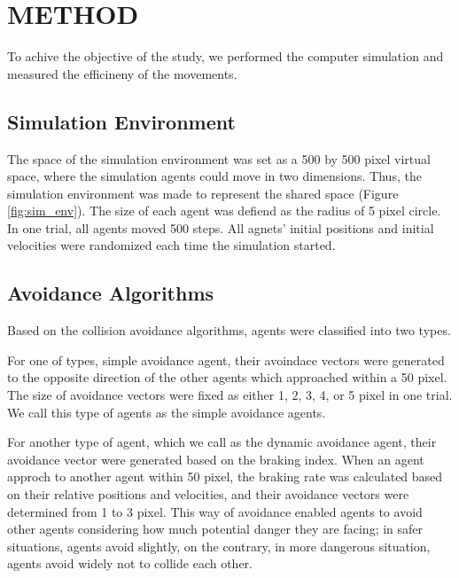 \documentclass[letterpaper, 10 pt, conference]{ieeeconf}  %
\begin{document}
\section{METHOD}
To achive the objective of the study, we performed the computer simulation and measured the efficineny of the movements.  

\subsection{Simulation Environment}
The space of the simulation environment was set as a 500 by 500 pixel virtual space, where the simulation agents could move in two dimensions. Thus, the simulation environment was made to represent the shared space (Figure \ref{fig:sim_env}). The size of each agent was defiend as the radius of 5 pixel circle. In one trial, all agents moved 500 steps. All agnets' initial positions and initial velocities were randomized each time the simulation started.

\subsection{Avoidance Algorithms}
Based on the collision avoidance algorithms, agents were classified into two types.

For one of types, simple avoidance agent, their avoindace vectors were generated to the opposite direction of the other agents which approached within a 50 pixel. The size of avoidance vectors were fixed as either 1, 2, 3, 4, or 5 pixel in one trial. We call this type of agents as the simple avoidance agents.

For another type of agent, which we call as the dynamic avoidance agent, their avoidance vector were generated based on the braking index. When an agent approch to another agent within 50 pixel, the braking rate was calculated based on their relative positions and velocities, and their avoidance vectors were determined from 1 to 3 pixel. This way of avoidance enabled agents to avoid other agents considering how much potential danger they are facing; in safer situations, agents avoid slightly, on the contrary, in more dangerous situation, agents avoid widely not to collide each other. 
\end{document}
